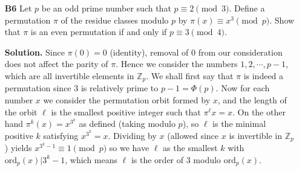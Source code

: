 \documentclass[11pt,a4paper]{article}
\newcommand{\bbZ}{\mathbb Z}
\newcommand{\<}{\langle}
\renewcommand{\>}{\rangle}
\newcommand{\ord}{\mathrm{ord}}
\begin{document}
\begin{enumerate}
	\item[\textbf{B6}]Let $p$ be an odd prime number such that $p\equiv 2\pmod{3}.$ Define a permutation $\pi$ of the residue classes modulo $p$ by $\pi(x)\equiv x^3\pmod{p}.$ Show that $\pi$ is an even permutation if and only if $p\equiv 3\pmod{4}.$
	
	\textbf{Solution.} Since $\pi(0)=0$ (identity), removal of 0 from our consideration does not affect the parity of $\pi$. Hence we consider the numbers $1, 2, \cdots , p-1$, which are all invertible elements in $\mathbb{Z}_p$. We shall first say that $\pi$ is indeed a permutation since 3 is relatively prime to $p-1=\Phi(p)$. Now for each number $x$ we consider the permutation orbit formed by $x$, and the length of the orbit $\ell$ is the smallest positive integer such that $\pi^\ell{x}=x$. On the other hand $\pi^{k}(x)=x^{3^k}$ as defined (taking modulo $p$), so $\ell$ is the minimal positive $k$ satisfying $x^{3^{k}}=x$. Dividing by $x$ (allowed since $x$ is invertible in $\bbZ_p$) yields $x^{3^k - 1}\equiv 1\pmod{p}$ so we have $\ell$ as the smallest $k$ with $\ord_p(x)|3^k-1$, which means $\ell$ is the order of 3 modulo $\ord_p(x)$. 
	

\end{enumerate}
\end{document}
